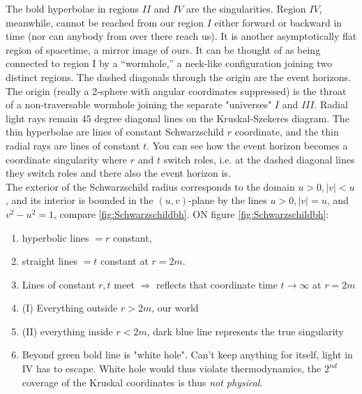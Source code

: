 The bold hyperbolae in regions $II$ and $IV$ are the singularities. Region $IV$,
meanwhile, cannot be reached from our region $I$ either forward or backward in time (nor can
anybody from over there reach us). It is another asymptotically flat region of spacetime, a
mirror image of ours. It can be thought of as being connected to region I by a “wormhole,” a
neck-like configuration joining two distinct regions. The dashed diagonals through the origin are the event horizons. The origin (really a 2-sphere with angular coordinates suppressed) is the throat of a non-traversable wormhole joining the separate "universes" $I$ and $III$. Radial light rays remain $45$ degree diagonal lines on the Kruskal-Szekeres diagram. The thin hyperbolae are lines of constant Schwarzschild $r$ coordinate, and the thin radial rays are lines of constant $t$. You can see how the event horizon becomes a coordinate singularity where $r$ and $t$ switch roles, i.e. at the dashed diagonal lines they switch roles and there also the event horizon is.\\
The exterior of the Schwarzschild radius corresponds to the domain $u>0, |v| < u$, and its interior is bounded in the $(u,v)$-plane by the lines $u>0,|v| =u$, and $v^2- u^2 =1$, compare \ref{fig:Schwarzschildbh}. ON figure \ref{fig:Schwarzschildbh}:
\begin{enumerate}
	\item hyperbolic lines $=r$ constant,
	\item straight lines $=t$ constant at $r=2m$. 
	\item Lines  of constant $r,t$ meet $\Rightarrow$ reflects that coordinate time $t \rightarrow \infty$ at $r=2m$
	\item (I) Everything outside $r>2m$, our world
	\item (II) everything inside $r<2m$, dark blue line represents the true singularity
	\item Beyond green bold line is "white hole". Can't keep anything for itself, light in IV has to escape. White hole would thus violate thermodynamics, the $2^{nd}$ coverage of the Kruskal coordinates is thus \emph{not physical}.
\end{enumerate}
